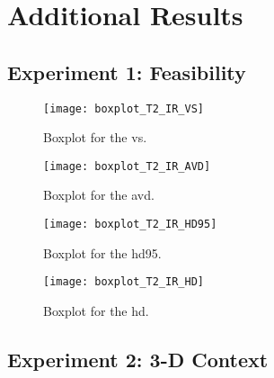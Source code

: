 \chapter{Additional Results} \label{app:results}

\section{Experiment 1: Feasibility} %

\begin{figure}[htbp]
	\centering
	\texttt{[image: boxplot\_T2\_IR\_VS]}
    \caption[Boxplot for the \acrlong{vs} for Feasibility]{Boxplot for the \acrlong{vs}.}
    \label{fig:results_boxplot_T2_IR_vs}
\end{figure}
\begin{figure}[htbp]
	\centering
	\texttt{[image: boxplot\_T2\_IR\_AVD]}
    \caption[Boxplot for the \acrlong{avd} for Feasibility]{Boxplot for the \acrlong{avd}.}
    \label{fig:results_boxplot_T2_IR_avd}
\end{figure}
\begin{figure}[htbp]
	\centering
	\texttt{[image: boxplot\_T2\_IR\_HD95]}
    \caption[Boxplot for the \acrlong{hd95} for Feasibility]{Boxplot for the \acrlong{hd95}.}
    \label{fig:results_boxplot_T2_IR_hd95}
\end{figure}
\begin{figure}[htbp]
	\centering
	\texttt{[image: boxplot\_T2\_IR\_HD]}
    \caption[Boxplot for the \acrlong{hd} for Feasibility]{Boxplot for the \acrlong{hd}.}
    \label{fig:results_boxplot_T2_IR_hd}
\end{figure}

\section{Experiment 2: 3-D Context} %

